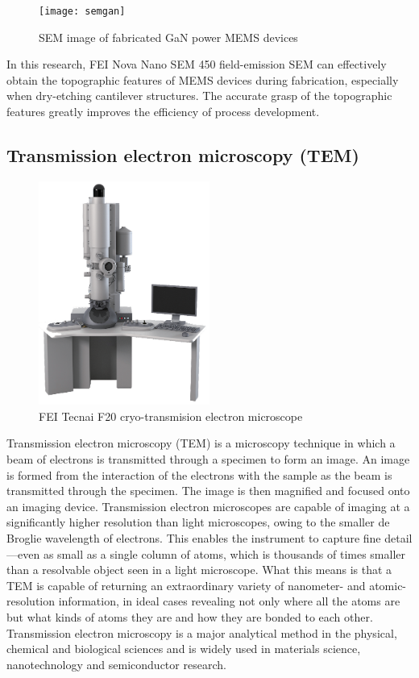 \begin{figure}[H] 
\centering    
\texttt{[image: semgan]}
\caption[SEM image of fabricated GaN power MEMS devices]{SEM image of fabricated GaN power MEMS devices}
\label{fig:semgan}
\end{figure}

In this research, FEI Nova Nano SEM 450 field-emission SEM can effectively obtain the topographic features of MEMS devices during fabrication, especially when dry-etching cantilever  structures. The accurate grasp of the topographic features greatly improves the efficiency of process development.

\subsection{Transmission electron microscopy (TEM)}

\begin{figure}[ht] 
\centering    
\includegraphics[width=0.5\textwidth]{TEM}
\caption[FEI Tecnai F20 cryo-transmision electron microscope]{FEI Tecnai F20 cryo-transmision electron microscope}
\label{fig:tem}
\end{figure}

Transmission electron microscopy (TEM)  is a microscopy technique in which a beam of electrons is transmitted through a specimen to form an image.  An image is formed from the interaction of the electrons with the sample as the beam is transmitted through the specimen. The image is then magnified and focused onto an imaging device. Transmission electron microscopes are capable of imaging at a significantly higher resolution than light microscopes, owing to the smaller de Broglie wavelength of electrons. This enables the instrument to capture fine detail—even as small as a single column of atoms, which is thousands of times smaller than a resolvable object seen in a light microscope.  What this means is that a TEM is capable of returning an extraordinary variety of nanometer- and atomic-resolution information, in ideal cases revealing not only where all the atoms are but what kinds of atoms they are and how they are bonded to each other. Transmission electron microscopy is a major analytical method in the physical, chemical and biological sciences and is widely used in materials science, nanotechnology and semiconductor research. 

